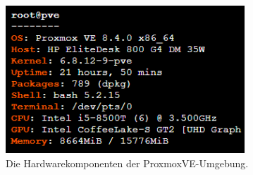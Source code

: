 \documentclass[12pt]{scrreprt}
\begin{document}
\begin{thebibliography}{99}
\begin{figure}[htbp]
	\centering
	\includegraphics[width=0.8\textwidth]{proxmox-hardware.png}
	\caption{Die Hardwarekomponenten der ProxmoxVE-Umgebung.}
	\label{fig:hardware-prox} %
\end{figure}
	\end{thebibliography}
	\newpage
	
\end{document}
